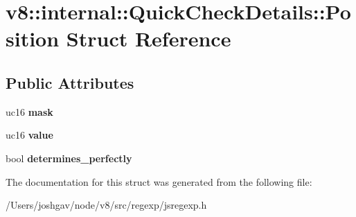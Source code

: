 \hypertarget{structv8_1_1internal_1_1_quick_check_details_1_1_position}{}\section{v8\+:\+:internal\+:\+:Quick\+Check\+Details\+:\+:Position Struct Reference}
\label{structv8_1_1internal_1_1_quick_check_details_1_1_position}
\subsection*{Public Attributes}
\begin{DoxyCompactItemize}
\item 
uc16 {\bfseries mask}\hypertarget{structv8_1_1internal_1_1_quick_check_details_1_1_position_aeb884849a8690bba0d4e9175d10af742}{}\label{structv8_1_1internal_1_1_quick_check_details_1_1_position_aeb884849a8690bba0d4e9175d10af742}

\item 
uc16 {\bfseries value}\hypertarget{structv8_1_1internal_1_1_quick_check_details_1_1_position_af6100b18395071db66ec6c33f51e52d9}{}\label{structv8_1_1internal_1_1_quick_check_details_1_1_position_af6100b18395071db66ec6c33f51e52d9}

\item 
bool {\bfseries determines\+\_\+perfectly}\hypertarget{structv8_1_1internal_1_1_quick_check_details_1_1_position_ad2a5c9be399371a2ebbbd56b483f2fd9}{}\label{structv8_1_1internal_1_1_quick_check_details_1_1_position_ad2a5c9be399371a2ebbbd56b483f2fd9}

\end{DoxyCompactItemize}


The documentation for this struct was generated from the following file\+:\begin{DoxyCompactItemize}
\item 
/\+Users/joshgav/node/v8/src/regexp/jsregexp.\+h\end{DoxyCompactItemize}
